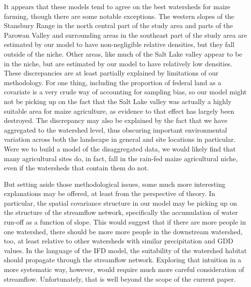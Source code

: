 \documentclass[
  number,
  preprint,
  3p]{elsarticle}
\begin{document}
It appears that these models tend to agree on the best watersheds for
maize farming, though there are some notable exceptions. The western
slopes of the Stansbury Range in the north central part of the study
area and parts of the Parowan Valley and surrounding areas in the
southeast part of the study area are estimated by our model to have
non-negligible relative densities, but they fall outside of the niche.
Other areas, like much of the Salt Lake valley appear to be in the
niche, but are estimated by our model to have relatively low densities.
These discrepancies are at least partially explained by limitations of
our methodology. For one thing, including the proportion of federal land
as a covariate is a very crude way of accounting for sampling bias, so
our model might not be picking up on the fact that the Salt Lake valley
was actually a highly suitable area for maize agriculture, as evidence
to that effect has largely been destroyed. The discrepancy may also be
explained by the fact that we have aggregated to the watershed level,
thus obscuring important environmental variation across both the
landscape in general and site locations in particular. Were we to build
a model of the disaggregated data, we would likely find that many
agricultural sites do, in fact, fall in the rain-fed maize agricultural
niche, even if the watersheds that contain them do not.

But setting aside those methodological issues, some much more
interesting explanations may be offered, at least from the perspective
of theory. In particular, the spatial covariance structure in our model
may be picking up on the structure of the streamflow network,
specifically the accumulation of water run-off as a function of slope.
This would suggest that if there are more people in one watershed, there
should be more more people in the downstream watershed, too, at least
relative to other watersheds with similar precipitation and GDD values.
In the language of the IFD model, the suitability of the watershed
habitat should propagate through the streamflow network. Exploring that
intuition in a more systematic way, however, would require much more
careful consideration of streamflow. Unfortunately, that is well beyond
the scope of the current paper.
\end{document}
